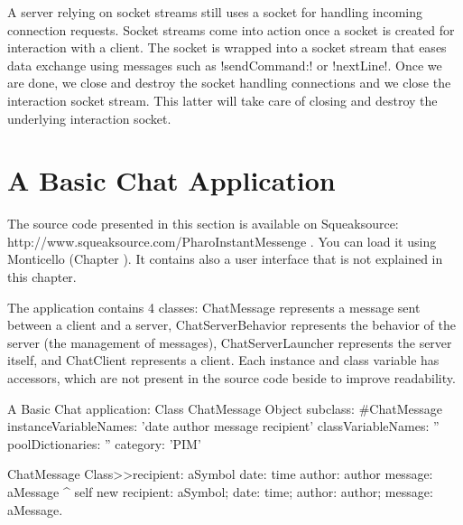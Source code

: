 \documentclass[a4paper,10pt,twoside]{book}
\begin{document}
A server relying on socket streams still uses a socket for handling incoming connection requests.
Socket streams come into action once a socket is created for interaction with a client.
The socket is wrapped into a socket stream that eases data exchange using messages such as \ct!sendCommand:! or \ct!nextLine!.
Once we are done, we close and destroy the socket handling connections and we close the interaction socket stream.
This latter will take care of closing and destroy the underlying interaction socket.


\section{A Basic Chat Application}

The source code presented in this section is available on Squeaksource: http://www.squeaksource.com/PharoInstantMessenge . You can load it using Monticello (Chapter ). It contains also a user interface that is not explained in this chapter.

The application contains 4 classes: ChatMessage represents a message sent between a client and a server, ChatServerBehavior represents the behavior of the server (\eg the management of messages), ChatServerLauncher represents the server itself, and ChatClient represents a client. Each instance and class variable has accessors, which are not present in the source code beside to improve readability.

\begin{script}{A Basic Chat application: Class ChatMessage}
Object subclass: #ChatMessage
	instanceVariableNames: 'date author message recipient'
	classVariableNames: ''
	poolDictionaries: ''
	category: 'PIM'

ChatMessage Class>>recipient: aSymbol date: time author: author message: aMessage
	^ self new
			recipient: aSymbol;
			date: time;
			author: author;
			message: aMessage.
\end{script}
\end{document}
